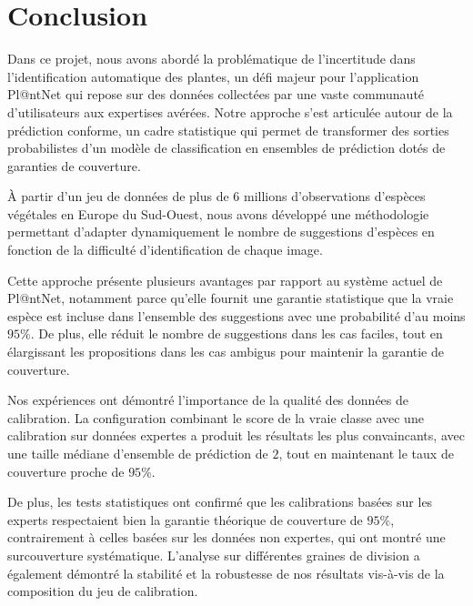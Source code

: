 \documentclass[a4paper,12pt]{article}
\begin{document}

\section{Conclusion}

Dans ce projet, nous avons abordé la problématique de l'incertitude dans l'identification automatique des plantes, un défi majeur pour l'application Pl@ntNet qui repose sur des données collectées par une vaste communauté d'utilisateurs aux expertises avérées. Notre approche s'est articulée autour de la prédiction conforme, un cadre statistique qui permet de transformer des sorties probabilistes d'un modèle de classification en ensembles de prédiction dotés de garanties de couverture.

\vspace{0.2cm}

À partir d'un jeu de données de plus de $6$ millions d'observations d'espèces végétales en Europe du Sud-Ouest, nous avons développé une méthodologie permettant d'adapter dynamiquement le nombre de suggestions d'espèces en fonction de la difficulté d'identification de chaque image. 

\vspace{0.2cm}

Cette approche présente plusieurs avantages par rapport au système actuel de Pl@ntNet, notamment parce qu'elle fournit une garantie statistique que la vraie espèce est incluse dans l'ensemble des suggestions avec une probabilité d'au moins $95\%$. De plus, elle réduit le nombre de suggestions dans les cas faciles, tout en élargissant les propositions dans les cas ambigus pour maintenir la garantie de couverture.

\vspace{0.2cm}

Nos expériences ont démontré l'importance de la qualité des données de calibration. La configuration combinant le score de la vraie classe avec une calibration sur données expertes a produit les résultats les plus convaincants, avec une taille médiane d'ensemble de prédiction de $2$, tout en maintenant le taux de couverture proche de $95\%$.

\vspace{0.2cm}

De plus, les tests statistiques ont confirmé que les calibrations basées sur les experts respectaient bien la garantie théorique de couverture de $95\%$, contrairement à celles basées sur les données non expertes, qui ont montré une surcouverture systématique. L’analyse sur différentes graines de division a également démontré la stabilité et la robustesse de nos résultats vis-à-vis de la composition du jeu de calibration.
\end{document}

